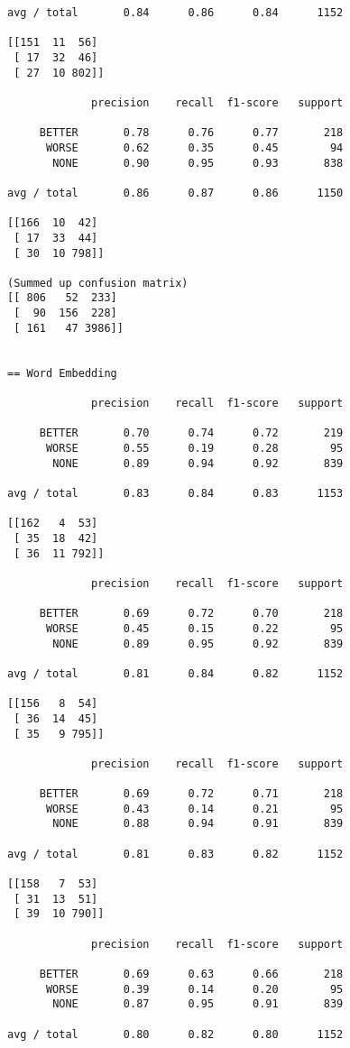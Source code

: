 \begin{appendices}
\begin{verbatim}
avg / total       0.84      0.86      0.84      1152

[[151  11  56]
 [ 17  32  46]
 [ 27  10 802]]
 
             precision    recall  f1-score   support

     BETTER       0.78      0.76      0.77       218
      WORSE       0.62      0.35      0.45        94
       NONE       0.90      0.95      0.93       838

avg / total       0.86      0.87      0.86      1150

[[166  10  42]
 [ 17  33  44]
 [ 30  10 798]]
 
(Summed up confusion matrix)
[[ 806   52  233]
 [  90  156  228]
 [ 161   47 3986]]


== Word Embedding

             precision    recall  f1-score   support

     BETTER       0.70      0.74      0.72       219
      WORSE       0.55      0.19      0.28        95
       NONE       0.89      0.94      0.92       839

avg / total       0.83      0.84      0.83      1153

[[162   4  53]
 [ 35  18  42]
 [ 36  11 792]]
 
             precision    recall  f1-score   support

     BETTER       0.69      0.72      0.70       218
      WORSE       0.45      0.15      0.22        95
       NONE       0.89      0.95      0.92       839

avg / total       0.81      0.84      0.82      1152

[[156   8  54]
 [ 36  14  45]
 [ 35   9 795]]
 
             precision    recall  f1-score   support

     BETTER       0.69      0.72      0.71       218
      WORSE       0.43      0.14      0.21        95
       NONE       0.88      0.94      0.91       839

avg / total       0.81      0.83      0.82      1152

[[158   7  53]
 [ 31  13  51]
 [ 39  10 790]]
 
             precision    recall  f1-score   support

     BETTER       0.69      0.63      0.66       218
      WORSE       0.39      0.14      0.20        95
       NONE       0.87      0.95      0.91       839

avg / total       0.80      0.82      0.80      1152


\end{verbatim}
\end{appendices}
